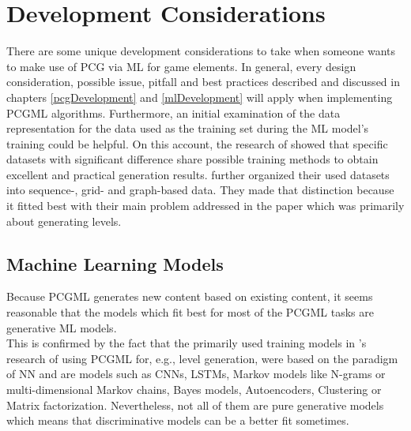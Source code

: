 \documentclass[MGS,Master,english]{twbook}%
\begin{document}
\section{Development Considerations} \label{PCGML::devConsiderations}
There are some unique development considerations to take when someone wants to make use of PCG via ML for game elements. In general, every design consideration, possible issue, pitfall and best practices described and discussed in chapters \ref{pcgDevelopment} and \ref{mlDevelopment} will apply when implementing PCGML algorithms. Furthermore, an initial examination of the data representation for the data used as the training set during the ML model’s training could be helpful. On this account, the research of \citep{pcgml::paper} showed that specific datasets with significant difference share possible training methods to obtain excellent and practical generation results. \citep{pcgml::paper} further organized their used datasets into sequence-, grid- and graph-based data. They made that distinction because it fitted best with their main problem addressed in the paper which was primarily about generating levels.

\subsection{Machine Learning Models}
Because PCGML generates new content based on existing content, it seems reasonable that the models which fit best for most of the PCGML tasks are generative ML models.\\
This is confirmed by the fact that the primarily used training models in 's research of using PCGML for, e.g., level generation, were based on the paradigm of \ac{NN} and are models such as \acp{CNN}, \acp{LSTM}, Markov models like N-grams or multi-dimensional Markov chains, Bayes models, Autoencoders, Clustering or Matrix factorization. Nevertheless, not all of them are pure generative models which means that discriminative models can be a better fit sometimes.
\end{document}
